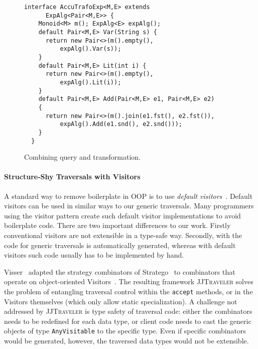 \begin{figure}[t]
\nocaptionrule
\begin{lstlisting}[mathescape=true]
  interface AccuTrafoExp<M,E> extends
      ExpAlg<Pair<M,E>> {
    Monoid<M> m(); ExpAlg<E> expAlg();
    default Pair<M,E> Var(String s) {
      return new Pair<>(m().empty(),
          expAlg().Var(s));
    }
    default Pair<M,E> Lit(int i) {
      return new Pair<>(m().empty(),
          expAlg().Lit(i));
    }
    default Pair<M,E> Add(Pair<M,E> e1, Pair<M,E> e2)
    {
      return new Pair<>(m().join(e1.fst(), e2.fst()),
          expAlg().Add(e1.snd(), e2.snd()));
    }
  }
\end{lstlisting}
\caption{Combining query and transformation.}
\label{FIG:accuTrafo}
\end{figure}

\paragraph{Structure-Shy Traversals with Visitors}
A standard way to remove boilerplate in OOP is to use \emph{default
  visitors}~\cite{nordberg96variations}. Default visitors can be used
in similar ways to our generic traversals. Many programmers using
the visitor pattern create such default visitor implementations to
avoid boilerplate code. There are two important differences to
our work. Firstly conventional visitors are not extensible in a
type-safe way. Secondly, with \name the code for generic traversals
is automatically generated, whereas with default visitors such code
usually has to be implemented by hand.

Visser~\cite{visser01visitor} adapted the strategy combinators of Stratego~\cite{visser1998core,Visser:1998:BPO:289423.289425} to combinators that operate on object-oriented Visitors~\cite{gof}.
The resulting framework \textsc{JJTraveler} solves the problem of entangling traversal control within the \lstinline{accept} methods, or in the Visitors themselves (which only allow static specialization).
A challenge not addressed by \textsc{JJTraveler} is type safety of traversal code: either the combinators needs to be redefined for each data type, or client code needs to cast the generic objects of type \lstinline{AnyVisitable} to the specific type.
Even if specific combinators would be generated, however, the traversed data types would not be extensible.

